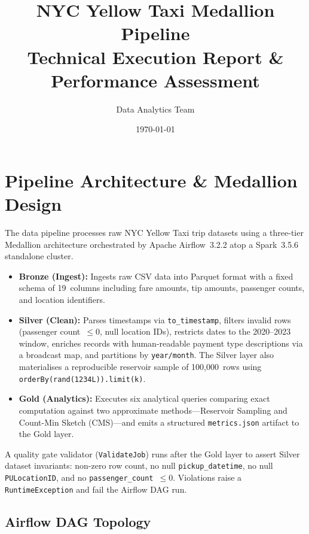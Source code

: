 \documentclass{article}
\title{NYC Yellow Taxi Medallion Pipeline\\[0.4em]\large Technical Execution Report \& Performance Assessment}
\author{Data Analytics Team}
\date{\today}
\begin{document}
\maketitle

\tableofcontents
\newpage


\section{Pipeline Architecture \& Medallion Design}

The data pipeline processes raw NYC Yellow Taxi trip datasets using a three-tier Medallion architecture orchestrated by Apache Airflow~3.2.2 atop a Spark~3.5.6 standalone cluster.

\begin{itemize}[nosep]
    \item \textbf{Bronze (Ingest):} Ingests raw CSV data into Parquet format with a fixed schema of 19~columns including fare amounts, tip amounts, passenger counts, and location identifiers.
    \item \textbf{Silver (Clean):} Parses timestamps via \texttt{to\_timestamp}, filters invalid rows (passenger count~$\le 0$, null location IDs), restricts dates to the 2020--2023 window, enriches records with human-readable payment type descriptions via a broadcast map, and partitions by \texttt{year/month}. The Silver layer also materialises a reproducible reservoir sample of 100{,}000~rows using \texttt{orderBy(rand(1234L)).limit(k)}.
    \item \textbf{Gold (Analytics):} Executes six analytical queries comparing exact computation against two approximate methods—Reservoir Sampling and Count-Min Sketch (CMS)—and emits a structured \texttt{metrics.json} artifact to the Gold layer.
\end{itemize}

A quality gate validator (\texttt{ValidateJob}) runs after the Gold layer to assert Silver dataset invariants: non-zero row count, no null \texttt{pickup\_datetime}, no null \texttt{PULocationID}, and no \texttt{passenger\_count}~$\le 0$. Violations raise a \texttt{RuntimeException} and fail the Airflow DAG run.

\subsection{Airflow DAG Topology}
\end{document}

